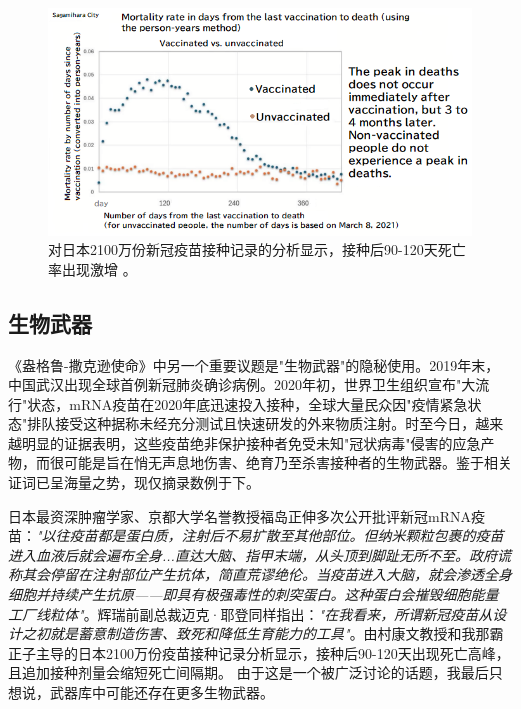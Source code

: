 \documentclass[10pt,twocolumn,letterpaper]{article}
\begin{document}
\clearpage
\twocolumn

\begin{figure}[t]
\begin{center}
\includegraphics[width=1\textwidth]{japan.png}
\end{center}
   \caption{对日本2100万份新冠疫苗接种记录的分析显示，接种后90-120天死亡率出现激增 \cite{40,41}。}
   \label{fig:17}
\end{figure}

\subsection{生物武器}
《盎格鲁-撒克逊使命》中另一个重要议题是"生物武器"的隐秘使用。2019年末，中国武汉出现全球首例新冠肺炎确诊病例。2020年初，世界卫生组织宣布"大流行"状态，mRNA疫苗在2020年底迅速投入接种，全球大量民众因"疫情紧急状态"排队接受这种据称未经充分测试且快速研发的外来物质注射\cite{31}。时至今日，越来越明显的证据表明，这些疫苗绝非保护接种者免受未知"冠状病毒"侵害的应急产物，而很可能是旨在悄无声息地伤害、绝育乃至杀害接种者的生物武器。鉴于相关证词已呈海量之势，现仅摘录数例于下。

日本最资深肿瘤学家、京都大学名誉教授福岛正伸多次公开批评新冠mRNA疫苗\cite{35,36}：\textit{"以往疫苗都是蛋白质，注射后不易扩散至其他部位。但纳米颗粒包裹的疫苗进入血液后就会遍布全身...直达大脑、指甲末端，从头顶到脚趾无所不至。政府谎称其会停留在注射部位产生抗体，简直荒谬绝伦。当疫苗进入大脑，就会渗透全身细胞并持续产生抗原——即具有极强毒性的刺突蛋白。这种蛋白会摧毁细胞能量工厂线粒体"\cite{37,38}}。辉瑞前副总裁迈克·耶登同样指出：\textit{"在我看来，所谓新冠疫苗从设计之初就是蓄意制造伤害、致死和降低生育能力的工具"\cite{39}}。由村康文教授和我那霸正子主导的日本2100万份疫苗接种记录分析显示，接种后90-120天出现死亡高峰，且追加接种剂量会缩短死亡间隔期\cite{40,41}。
由于这是一个被广泛讨论的话题，我最后只想说，武器库中可能还存在更多生物武器。
\end{document}
